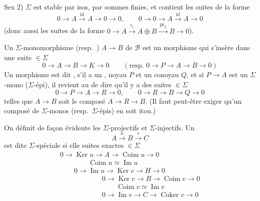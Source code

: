 \documentclass[11pt,a4paper]{article}
\begin{document}
Sex 2) $\Sigma$ est stable par isos, par sommes finies, et contient les suites de la forme
\[
0 \to A \xrightarrow{\ \mathrm{id}\ } A \to 0 \to 0, \qquad 0 \to 0 \to A \xrightarrow{\ \mathrm{id}\ } A \to 0
\]
(donc aussi les suites de la forme
$0 \to A \xrightarrow{\ i_1\ } A \oplus B \xrightarrow{\ \mathrm{pr}_2\ } B \to 0$).

Un \struck{\ill{}} $\Sigma$-monomorphisme (resp.\ \ill{}) \ill{} $A \to B$ de $\mathcal{B}$ est un
morphisme qui s'insère dans une suite $\in \Sigma$
\[
0 \to A \to B \to K \to 0 \qquad (\text{resp.\ } 0 \to P \to A \to B \to 0)
\]
Un morphisme  est dit \add{$\Sigma$-}, s'il a un
\struck{\ill{}} ,
noyau $P$ et un conoyau $Q$, et si $P \to A$ \struck{\ill{}} est un $\Sigma$-mono
($\Sigma$-épi), il revient au \ill{} de dire qu'il y a
des suites $\in \Sigma$
\[
0 \to P \to A \to R \to 0, \qquad 0 \to R \to B \to Q \to 0
\]
telles que $A \to B$ soit le composé $A \to R \to B$.
(Il faut peut-être exiger qu'un composé de $\Sigma$-monos (resp.\ $\Sigma$-épis) en soit itou.)

On définit de façon évidente les $\Sigma$-projectifs  et
$\Sigma$-injectifs. Un 
\[
A \xrightarrow{\ u\ } B \xrightarrow{\ v\ } C
\]
est dite $\Sigma$-spéciale \struck{\ill{}} si elle \struck{\ill{} \ill{}} \ill{}
\ill{} suites exactes $\in \Sigma$
\[
\begin{array}{l}
0 \to \operatorname{Ker} u \to A \to \operatorname{Coim} u \to 0 \\
\qquad\qquad \operatorname{Coim} u \simeq \operatorname{Im} u \\
\qquad 0 \to \operatorname{Im} u \to \operatorname{Ker} v \to H \to 0 \\
\qquad\qquad\qquad 0 \to \operatorname{Ker} v \to B \to \operatorname{Coim} v \to 0 \\
\qquad\qquad\qquad\qquad \operatorname{Coim} v \simeq \operatorname{Im} v \\
\qquad\qquad\qquad 0 \to \operatorname{Im} v \to C \to \operatorname{Coker} v \to 0
\end{array}
\]
\end{document}
